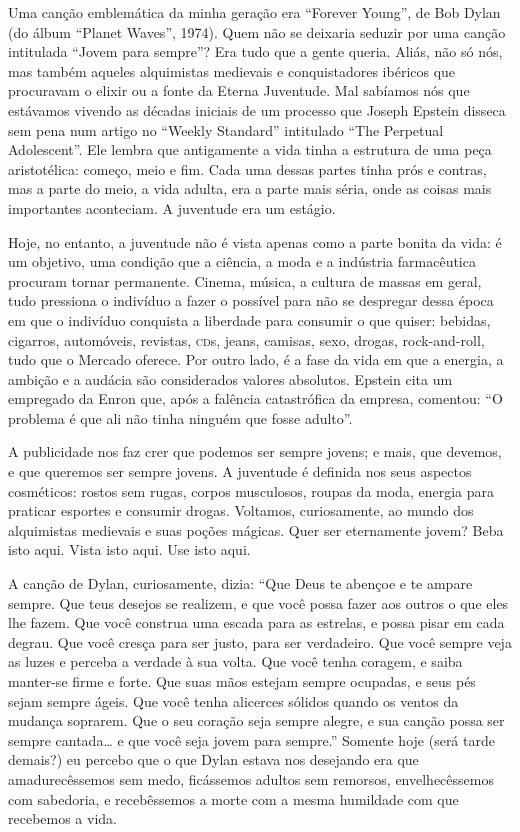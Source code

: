 Uma canção emblemática da minha geração era “Forever Young”, de Bob
Dylan (do álbum “Planet Waves”, 1974). Quem não se deixaria seduzir
por uma canção intitulada “Jovem para sempre”?  Era tudo que a gente
queria. Aliás, não só nós, mas também aqueles alquimistas medievais e
conquistadores ibéricos que procuravam o elixir ou a fonte da Eterna
Juventude. Mal sabíamos nós que estávamos vivendo as décadas iniciais
de um processo que Joseph Epstein disseca sem pena num artigo no
“Weekly Standard” intitulado “The Perpetual Adolescent”.  Ele lembra
que antigamente a vida tinha a estrutura de uma peça aristotélica:
começo, meio e fim.  Cada uma dessas partes tinha prós e contras, mas
a parte do meio, a vida adulta, era a parte mais séria, onde as
coisas mais importantes aconteciam. A juventude era um estágio.

Hoje, no entanto, a juventude não é vista apenas como a parte bonita
da vida: é um objetivo, uma condição que a ciência, a moda e a
indústria farmacêutica procuram tornar permanente. Cinema, música, a
cultura de massas em geral, tudo pressiona o indivíduo a fazer o
possível para não se despregar dessa época em que o indivíduo
conquista a liberdade para consumir o que quiser: bebidas, cigarros,
automóveis, revistas, \textsc{cd}s, jeans, camisas, sexo, drogas,
rock-and-roll, tudo que o Mercado oferece. Por outro lado, é a fase
da vida em que a energia, a ambição e a audácia são considerados
valores absolutos. Epstein cita um empregado da Enron que, após a
falência catastrófica da empresa, comentou: “O problema é que ali não
tinha ninguém que fosse adulto”.

A publicidade nos faz crer que podemos ser sempre jovens; e mais, que
devemos, e que queremos ser sempre jovens. A juventude é definida nos
seus aspectos cosméticos: rostos sem rugas, corpos musculosos, roupas
da moda, energia para praticar esportes e consumir drogas. Voltamos,
curiosamente, ao mundo dos alquimistas medievais e suas poções
mágicas. Quer ser eternamente jovem?  Beba isto aqui. Vista isto
aqui. Use isto aqui.

A canção de Dylan, curiosamente, dizia: “Que Deus te abençoe e te
ampare sempre. Que teus desejos se realizem, e que você possa fazer
aos outros o que eles lhe fazem. Que você construa uma escada para as
estrelas, e possa pisar em cada degrau. Que você cresça para ser
justo, para ser verdadeiro. Que você sempre veja as luzes e perceba a
verdade à sua volta. Que você tenha coragem, e saiba manter-se firme
e forte. Que suas mãos estejam sempre ocupadas, e seus pés sejam
sempre ágeis. Que você tenha alicerces sólidos quando os ventos da
mudança soprarem. Que o seu coração seja sempre alegre, e sua canção
possa ser sempre cantada… e que você seja jovem para sempre.” 
Somente hoje (será tarde demais?) eu percebo que o que Dylan estava
nos desejando era que amadurecêssemos sem medo, ficássemos adultos
sem remorsos, envelhecêssemos com sabedoria, e recebêssemos a morte
com a mesma humildade com que recebemos a vida.

